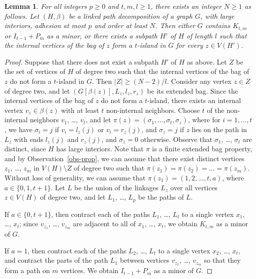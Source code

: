 \documentclass[12pt]{article}
\newtheorem{lemma}[theorem]{Lemma}
\begin{document}
\begin{lemma}\label{lemma-main-tw}
For all integers $p\ge 0$ and $t,m,l\ge 1$, there exists an integer $N\ge 1$ as follows.
Let $(H,\beta)$ be a linked path decomposition of a graph $G$,
with large interiors, adhesion at most $p$ and order at least $N$.
Then either $G$ contains $K_{t,m}$ or $I_{t-1}+P_m$ as a minor, or there exists  a subpath $H'$ of $H$  of length $l$ such that the
internal vertices of the bag of $z$ form a $t$-island in $G$ for every $z \in V(H')$.
\end{lemma}
\begin{proof}
Suppose that there does not exist  a subpath $H'$ of $H$ as above.	
Let $Z$ be the set of vertices of $H$ of degree two such that the internal vertices of the bag of $z$ do not form a $t$-island in $G$. Then $|Z| \geq (N-2)/l$.
Consider any vertex $z\in Z$ of degree two, and let $(G[\beta(z)],L_z,l_z,r_z)$ be its extended bag.
Since the internal vertices of the bag of $z$ do not form a $t$-island, there exists an internal vertex $v_z\in \beta(z)$
with at least $t$ non-internal neighbors.  Choose $t$ of the non-internal neighbors $v_1$, \ldots, $v_t$, and let
$\pi(z)=(\sigma_1,\ldots,\sigma_t,\sigma_z)$, where for $i=1,\ldots,t$, we have $\sigma_i=j$ if $v_i=l_z(j)$ or $v_i=r_z(j)$,
and $\sigma_z=j$ if $z$ lies on the path in $L_z$ with ends $l_z(j)$ and $r_z(j)$, and $\sigma_z=0$ otherwise.
Observe that $\sigma_1$, \ldots, $\sigma_t$ are distinct, since $H$ has large interiors.
Note that $\pi$ is a finite extended bag property, and by Observation~\ref{obs-prop}, we can assume that there exist
distinct vertices $z_1$, \ldots, $z_m$ in $V(H)\setminus Z$ of degree two such that $\pi(z_1)=\pi(z_2)=\ldots=\pi(z_m)$.
Without loss of generality, we can assume that $\pi(z_1)=(1,2,\ldots,t,a)$, where $a\in \{0,1,t+1\}$.
Let $L$ be the union of the linkages $L_z$ over all vertices $z\in V(H)$ of degree two, and let $L_1$, \ldots, $L_p$ be the paths of $L$.

If $a\in \{0,t+1\}$, then contract each of the paths $L_1$, \ldots, $L_t$ to a single vertex $x_1$, \ldots, $x_t$; since $v_{z_1}$, \ldots, $v_{z_m}$
are adjacent to all of $x_1$, \ldots, $x_t$, we obtain $K_{t,m}$ as a minor of $G$.

If $a=1$, then contract each of the paths $L_2$, \ldots, $L_t$ to a single vertex $x_2$, \ldots, $x_t$,
and contract the parts of the path $L_1$ between vertices $v_{z_1}$, \ldots, $v_{z_m}$
so that they form a path on $m$ vertices.  We obtain $I_{t-1}+P_m$ as a minor of $G$.
\end{proof}
\end{document}
